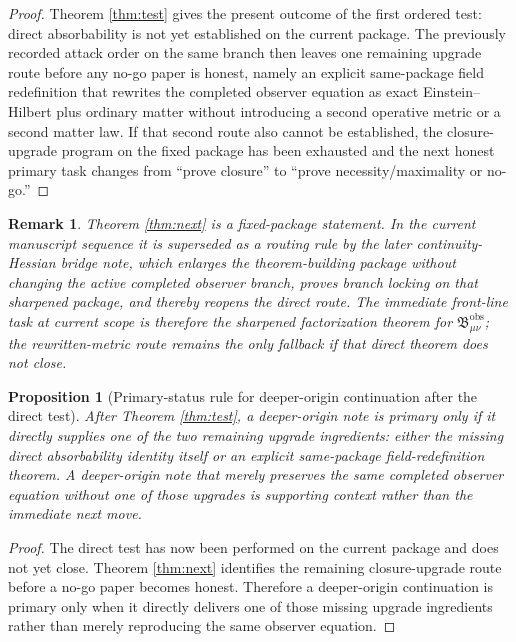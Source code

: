 \documentclass[11pt]{article}
\newcommand{\ObsBurden}{\mathfrak B_{\mu\nu}^{\mathrm{obs}}}
\newtheorem{proposition}{Proposition}
\newtheorem{remark}{Remark}
\begin{document}
\begin{proof}
Theorem \ref{thm:test} gives the present outcome of the first ordered test: direct absorbability is not yet established on the current package. The previously recorded attack order on the same branch then leaves one remaining upgrade route before any no-go paper is honest, namely an explicit same-package field redefinition that rewrites the completed observer equation as exact Einstein--Hilbert plus ordinary matter without introducing a second operative metric or a second matter law. If that second route also cannot be established, the closure-upgrade program on the fixed package has been exhausted and the next honest primary task changes from ``prove closure'' to ``prove necessity/maximality or no-go.''
\end{proof}

\begin{remark}
Theorem \ref{thm:next} is a fixed-package statement. In the current manuscript sequence it is superseded as a routing rule by the later continuity-Hessian bridge note, which enlarges the theorem-building package without changing the active completed observer branch, proves branch locking on that sharpened package, and thereby reopens the direct route. The immediate front-line task at current scope is therefore the sharpened factorization theorem for \(\ObsBurden\); the rewritten-metric route remains the only fallback if that direct theorem does not close.
\end{remark}

\begin{proposition}[Primary-status rule for deeper-origin continuation after the direct test]
\label{prop:depth}
After Theorem \ref{thm:test}, a deeper-origin note is primary only if it directly supplies one of the two remaining upgrade ingredients: either the missing direct absorbability identity itself or an explicit same-package field-redefinition theorem. A deeper-origin note that merely preserves the same completed observer equation without one of those upgrades is supporting context rather than the immediate next move.
\end{proposition}

\begin{proof}
The direct test has now been performed on the current package and does not yet close. Theorem \ref{thm:next} identifies the remaining closure-upgrade route before a no-go paper becomes honest. Therefore a deeper-origin continuation is primary only when it directly delivers one of those missing upgrade ingredients rather than merely reproducing the same observer equation.
\end{proof}
\end{document}
